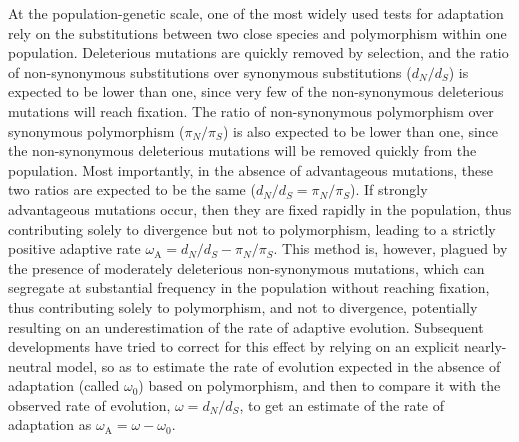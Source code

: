 \documentclass{article}
\newcommand{\dn}{d_N}
\newcommand{\ds}{d_S}
\newcommand{\dnds}{\dn / \ds}
\newcommand{\rateApop}{\omega_{\mathrm{A}}}
\newcommand{\pn}{\pi_N}
\newcommand{\ps}{\pi_S}
\newcommand{\pnps}{\pn / \ps}
\begin{document}
    At the population-genetic scale, one of the most widely used tests for adaptation rely on the substitutions between two close species and polymorphism within one population\cite{mcdonald_adaptative_1991}.
    Deleterious mutations are quickly removed by selection, and the ratio of non-synonymous substitutions over synonymous substitutions ($\dnds$) is expected to be lower than one, since very few of the non-synonymous deleterious mutations will reach fixation.
    The ratio of non-synonymous polymorphism over synonymous polymorphism ($\pnps$) is also expected to be lower than one, since the non-synonymous deleterious mutations will be removed quickly from the population.
    Most importantly, in the absence of advantageous mutations, these two ratios are expected to be the same ($\dnds=\pnps$).
    If strongly advantageous mutations occur, then they are fixed rapidly in the population, thus contributing solely to divergence but not to polymorphism, leading to a strictly positive adaptive rate $\rateApop = \dnds-\pnps$\cite{smith_adaptive_2002}.
    This method is, however, plagued by the presence of moderately deleterious non-synonymous mutations, which can segregate at substantial frequency in the population without reaching fixation, thus contributing solely to polymorphism, and not to divergence, potentially resulting on an underestimation of the rate of adaptive evolution\cite{eyre-walker_quantifying_2002}.
    Subsequent developments have tried to correct for this effect by relying on an explicit nearly-neutral model\cite{eyre-walker_estimating_2009, galtier_adaptive_2016}, so as to estimate the rate of evolution expected in the absence of adaptation (called $\omega_0$) based on polymorphism, and then to compare it with the observed rate of evolution, $\omega=\dnds$, to get an estimate of the rate of adaptation as $\rateApop = \omega-\omega_0$.
\end{document}
